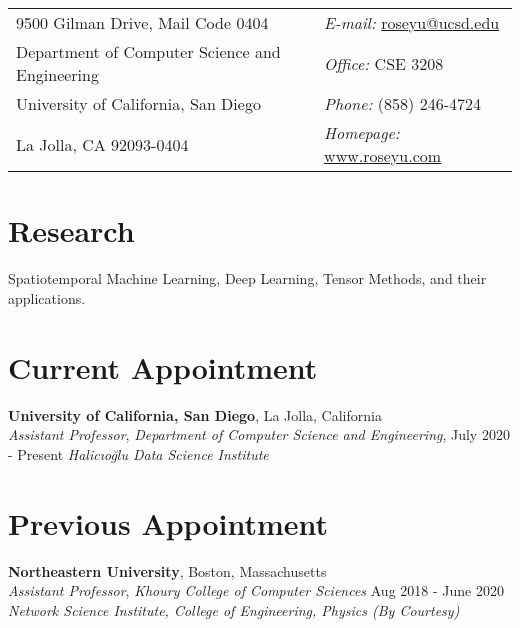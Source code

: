 \documentclass[margin,line]{res}
\newenvironment{list1}{
  \begin{list}{\ding{113}}{%
      \setlength{\itemsep}{0in}
      \setlength{\parsep}{0in} \setlength{\parskip}{0in}
      \setlength{\topsep}{0in} \setlength{\partopsep}{0in} 
      \setlength{\leftmargin}{0.17in}}}{\end{list}}
\begin{document}
\begin{resume}
\section{\sc }
\vspace{.05in}
\begin{tabular}{@{}p{3.5in}p{4in}}
9500 Gilman Drive, Mail Code 0404
 & {\it E-mail:}  \url{roseyu@ucsd.edu } \\   
Department of Computer Science and Engineering & {\it Office:} CSE 3208 \\University of California, San Diego & {\it Phone:}  (858) 246-4724 \\            
La Jolla, CA 92093-0404   & {\it Homepage:} \url{www.roseyu.com} \\     
\end{tabular}


\section{\sc Research}
Spatiotemporal  Machine Learning, Deep Learning, Tensor Methods, and their applications.

\section{\sc Current Appointment}


{\bf University of California, San Diego}, La Jolla, California \\
{\em Assistant Professor}, {\em Department of Computer Science and Engineering},  \hfill {July 2020 - Present }
{\em Halicıo\u{g}lu Data Science Institute}


\section{\sc Previous Appointment}

{\bf Northeastern University}, Boston, Massachusetts \\
{\em Assistant Professor}, {\em Khoury College of Computer Sciences}  \hfill {Aug 2018 - June 2020 }\\
{\em Network Science Institute, College of Engineering, Physics (By Courtesy)}



\end{resume}
\end{document}
